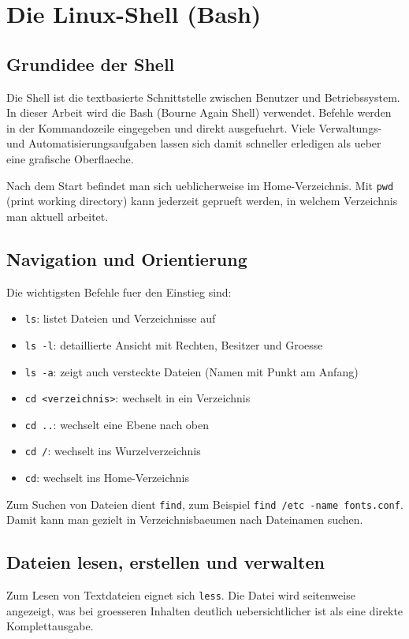 \documentclass[11pt, oneside, numbers=noenddot]{scrbook}
\begin{document}
\chapter{Die Linux-Shell (Bash)}
\section{Grundidee der Shell}
Die Shell ist die textbasierte Schnittstelle zwischen Benutzer und Betriebssystem. In dieser Arbeit wird die Bash (Bourne Again Shell) verwendet. Befehle werden in der Kommandozeile eingegeben und direkt ausgefuehrt. Viele Verwaltungs- und Automatisierungsaufgaben lassen sich damit schneller erledigen als ueber eine grafische Oberflaeche.

Nach dem Start befindet man sich ueblicherweise im Home-Verzeichnis. Mit \texttt{pwd} (print working directory) kann jederzeit geprueft werden, in welchem Verzeichnis man aktuell arbeitet.

\section{Navigation und Orientierung}
Die wichtigsten Befehle fuer den Einstieg sind:
\begin{itemize}
\item \texttt{ls}: listet Dateien und Verzeichnisse auf
\item \texttt{ls -l}: detaillierte Ansicht mit Rechten, Besitzer und Groesse
\item \texttt{ls -a}: zeigt auch versteckte Dateien (Namen mit Punkt am Anfang)
\item \texttt{cd <verzeichnis>}: wechselt in ein Verzeichnis
\item \texttt{cd ..}: wechselt eine Ebene nach oben
\item \texttt{cd /}: wechselt ins Wurzelverzeichnis
\item \texttt{cd}: wechselt ins Home-Verzeichnis
\end{itemize}

Zum Suchen von Dateien dient \texttt{find}, zum Beispiel \texttt{find /etc -name fonts.conf}. Damit kann man gezielt in Verzeichnisbaeumen nach Dateinamen suchen.

\section{Dateien lesen, erstellen und verwalten}
Zum Lesen von Textdateien eignet sich \texttt{less}. Die Datei wird seitenweise angezeigt, was bei groesseren Inhalten deutlich uebersichtlicher ist als eine direkte Komplettausgabe.
\end{document}
